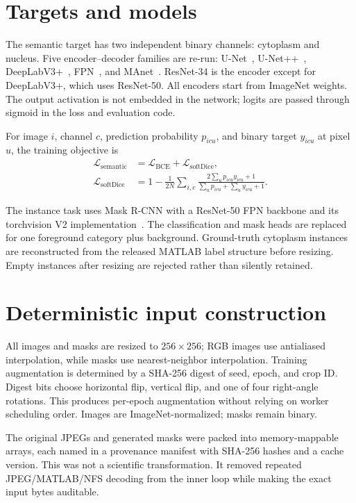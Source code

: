 \documentclass[11pt,oneside]{report}
\begin{document}
\section{Targets and models}

The semantic target has two independent binary channels: cytoplasm and nucleus. Five encoder--decoder families are re-run: U-Net~\cite{ronneberger2015unet}, U-Net++~\cite{zhou2020unetplusplus}, DeepLabV3+~\cite{chen2018deeplabv3plus}, FPN~\cite{lin2017fpn}, and MAnet~\cite{fan2020manet}. ResNet-34 is the encoder except for DeepLabV3+, which uses ResNet-50. All encoders start from ImageNet weights. The output activation is not embedded in the network; logits are passed through sigmoid in the loss and evaluation code.

For image $i$, channel $c$, prediction probability $p_{icu}$, and binary target $y_{icu}$ at pixel $u$, the training objective is
\begin{align}
\mathcal L_{\mathrm{semantic}}
&=\mathcal L_{\mathrm{BCE}}+\mathcal L_{\mathrm{softDice}},\\
\mathcal L_{\mathrm{softDice}}
&=1-\frac{1}{2N}\sum_{i,c}
\frac{2\sum_u p_{icu}y_{icu}+1}
{\sum_u p_{icu}+\sum_u y_{icu}+1}.
\end{align}

The instance task uses Mask R-CNN with a ResNet-50 FPN backbone and its torchvision V2 implementation~\cite{he2017maskrcnn}. The classification and mask heads are replaced for one foreground category plus background. Ground-truth cytoplasm instances are reconstructed from the released MATLAB label structure before resizing. Empty instances after resizing are rejected rather than silently retained.

\section{Deterministic input construction}

All images and masks are resized to $256\times256$; RGB images use antialiased interpolation, while masks use nearest-neighbor interpolation. Training augmentation is determined by a SHA-256 digest of seed, epoch, and crop ID. Digest bits choose horizontal flip, vertical flip, and one of four right-angle rotations. This produces per-epoch augmentation without relying on worker scheduling order. Images are ImageNet-normalized; masks remain binary.

The original JPEGs and generated masks were packed into memory-mappable arrays, each named in a provenance manifest with SHA-256 hashes and a cache version. This was not a scientific transformation. It removed repeated JPEG/MATLAB/NFS decoding from the inner loop while making the exact input bytes auditable.
\end{document}
